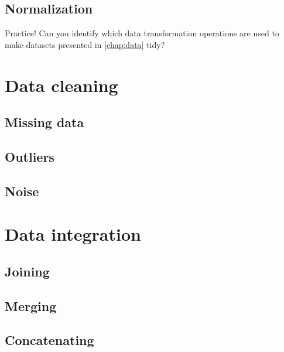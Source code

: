 \subsection{Normalization}

\begin{mainbox}{Practice!}
  Can you identify which data transformation operations are used to make datasets
  presented in \cref{chap:data} tidy?
\end{mainbox}

\section{Data cleaning}

\subsection{Missing data}

\subsection{Outliers}

\subsection{Noise}

\section{Data integration}

\subsection{Joining}

\subsection{Merging}

\subsection{Concatenating}

